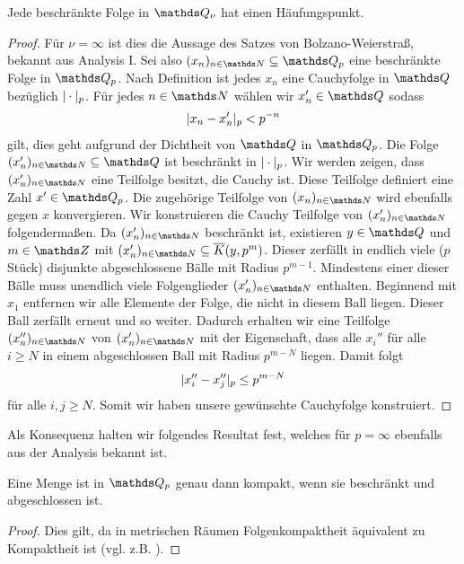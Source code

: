 \begin{thm}
Jede beschränkte Folge in $\Q_\nu$ hat einen Häufungspunkt.
\begin{proof}
Für $\nu=\infty$ ist dies die Aussage des Satzes von Bolzano-Weierstraß, bekannt aus Analysis I.
Sei also $(x_n)_{n\in \N} \subseteq \Q_p$ eine beschränkte Folge in $\Q_p$.
Nach Definition ist jedes $x_n$ eine Cauchyfolge in $\Q$ bezüglich $|\cdot|_p$.
Für jedes $n \in \N$ wählen wir $x_n' \in \Q$ sodass
\begin{align*}
|x_n-x_n'|_p<p^{-n}
\end{align*}
gilt, dies geht aufgrund der Dichtheit von $\Q$ in $\Q_p$.
Die Folge $(x_n')_{n\in \N}\subseteq \Q$ ist beschränkt in $|\cdot|_p$.
Wir werden zeigen, dass $(x_n')_{n\in \N}$ eine Teilfolge besitzt, die Cauchy ist.
Diese Teilfolge definiert eine Zahl $x'\in \Q_p$.
Die zugehörige Teilfolge von $(x_n)_{n\in \N}$ wird ebenfalls gegen $x$ konvergieren.
Wir konstruieren die Cauchy Teilfolge von $(x_n')_{n\in \N}$ folgendermaßen.
Da $(x_n')_{n \in \N}$ beschränkt ist, existieren $y \in \Q$ und $m\in \Z$ mit $(x_n')_{n\in \N}\subseteq \overline{K}(y,p^m)$. Dieser zerfällt in endlich viele ($p$ Stück) disjunkte abgeschlossene Bälle mit Radius $p^{m-1}$.
Mindestens einer dieser Bälle muss unendlich viele Folgenglieder $(x_n')_{n\in \N}$ enthalten.
Beginnend mit $x_1$ entfernen wir alle Elemente der Folge, die nicht in diesem Ball liegen.
Dieser Ball zerfällt erneut und so weiter.
Dadurch erhalten wir eine Teilfolge $(x_n'')_{n\in \N}$ von $(x_n')_{n\in \N} $ mit der Eigenschaft,
dass alle $x_i''$ für alle $i\geq N$ in einem abgeschlossen Ball
mit Radius $p^{m-N}$ liegen. Damit folgt
\begin{align*}
|x_i''-x_j''|_p\leq p^{m-N}
\end{align*}
für alle $i,j\geq N$. Somit wir haben unsere gewünschte Cauchyfolge konstruiert.
\end{proof}
\end{thm}

Als Konsequenz halten wir folgendes Resultat fest, welches für $p=\infty$ ebenfalls aus der Analysis bekannt ist.

\begin{cor}
Eine Menge ist in $\Q_p$ genau dann kompakt, wenn sie beschränkt und abgeschlossen ist.
\end{cor}
\begin{proof}
Dies gilt, da in metrischen Räumen Folgenkompaktheit äquivalent zu Kompaktheit ist (vgl. z.\thinspace B. \cite[Proposition 6.22]{manetti}).
\end{proof}


